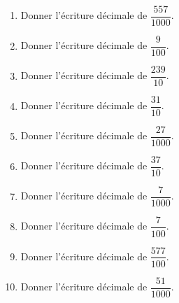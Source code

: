 \documentclass[9pt]{article}
\begin{document}
\begin{multicols}{2}
\begin{exercice}
\begin{multicols}{2}
\begin{enumerate}[itemsep=2em]
	\item \begin{minipage}[t]{\linewidth} Donner l'écriture décimale de $\dfrac{557}{1000}$. \end{minipage}
	\item \begin{minipage}[t]{\linewidth} Donner l'écriture décimale de $\dfrac{9}{100}$. \end{minipage}
	\item \begin{minipage}[t]{\linewidth} Donner l'écriture décimale de $\dfrac{239}{10}$. \end{minipage}
	\item \begin{minipage}[t]{\linewidth} Donner l'écriture décimale de $\dfrac{31}{10}$. \end{minipage}
	\item \begin{minipage}[t]{\linewidth} Donner l'écriture décimale de $\dfrac{27}{1000}$. \end{minipage}
	\item \begin{minipage}[t]{\linewidth} Donner l'écriture décimale de $\dfrac{37}{10}$. \end{minipage}
	\item \begin{minipage}[t]{\linewidth} Donner l'écriture décimale de $\dfrac{7}{1000}$. \end{minipage}
	\item \begin{minipage}[t]{\linewidth} Donner l'écriture décimale de $\dfrac{7}{100}$. \end{minipage}
	\item \begin{minipage}[t]{\linewidth} Donner l'écriture décimale de $\dfrac{577}{100}$. \end{minipage}
	\item \begin{minipage}[t]{\linewidth} Donner l'écriture décimale de $\dfrac{51}{1000}$. \end{minipage}
\end{enumerate}
\end{multicols}
\end{exercice}


\end{multicols}
\end{document}
